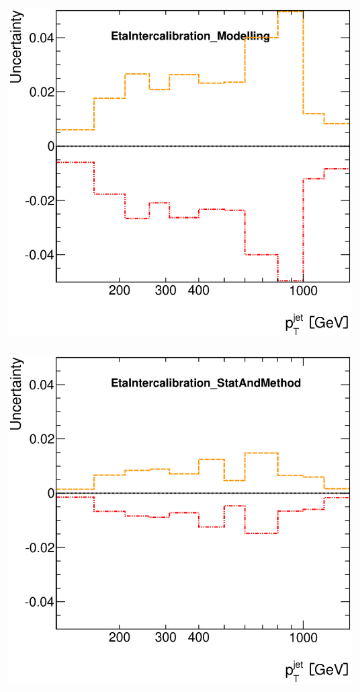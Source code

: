 \documentclass[12pt, twoside]{article}
\numberwithin{equation}{section}
\numberwithin{figure}{section}
\newenvironment{changemargin}[2]{%
\begin{list}{}{%
\setlength{\topsep}{0pt}%
\setlength{\leftmargin}{#1}%
\setlength{\rightmargin}{#2}%
\setlength{\listparindent}{\parindent}%
\setlength{\itemindent}{\parindent}%
\setlength{\parsep}{\parskip}%
}%
\item[]}{\end{list}}
\begin{document}
\begin{figure}[H]
\begin{changemargin}{-1.0cm}{-0.75cm}
\begin{changemargin}{-0.75cm}{-1.0cm}
\begin{subfigure}[b]{0.25\textwidth}
            \includegraphics[width=\textwidth]{./images/JetSystematics/JetSystematic-2.eps}
        \end{subfigure}
        \begin{subfigure}[b]{0.25\textwidth}
            \includegraphics[width=\textwidth]{./images/JetSystematics/JetSystematic-3.eps}

\end{subfigure}
\end{changemargin}
\end{changemargin}
\end{figure}
\end{document}
